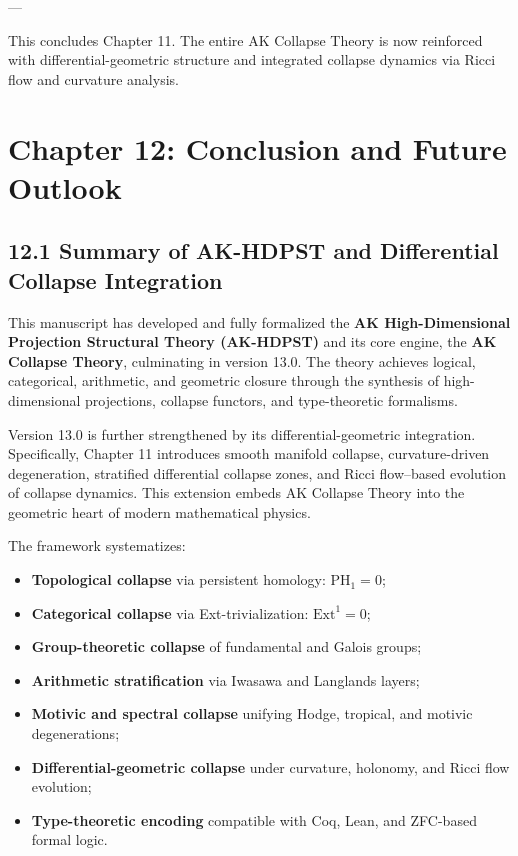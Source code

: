\documentclass[11pt]{article}
\begin{document}
---

\noindent This concludes Chapter 11. The entire AK Collapse Theory is now reinforced with differential-geometric structure and integrated collapse dynamics via Ricci flow and curvature analysis.



\section{Chapter 12: Conclusion and Future Outlook}

\subsection*{12.1 Summary of AK-HDPST and Differential Collapse Integration}

This manuscript has developed and fully formalized the \textbf{AK High-Dimensional Projection Structural Theory (AK-HDPST)} and its core engine, the \textbf{AK Collapse Theory}, culminating in version 13.0. The theory achieves logical, categorical, arithmetic, and geometric closure through the synthesis of high-dimensional projections, collapse functors, and type-theoretic formalisms.

Version 13.0 is further strengthened by its differential-geometric integration. Specifically, Chapter 11 introduces smooth manifold collapse, curvature-driven degeneration, stratified differential collapse zones, and Ricci flow–based evolution of collapse dynamics. This extension embeds AK Collapse Theory into the geometric heart of modern mathematical physics.

The framework systematizes:
\begin{itemize}
    \item \textbf{Topological collapse} via persistent homology: \( \mathrm{PH}_1 = 0 \);
    \item \textbf{Categorical collapse} via Ext-trivialization: \( \mathrm{Ext}^1 = 0 \);
    \item \textbf{Group-theoretic collapse} of fundamental and Galois groups;
    \item \textbf{Arithmetic stratification} via Iwasawa and Langlands layers;
    \item \textbf{Motivic and spectral collapse} unifying Hodge, tropical, and motivic degenerations;
    \item \textbf{Differential-geometric collapse} under curvature, holonomy, and Ricci flow evolution;
    \item \textbf{Type-theoretic encoding} compatible with Coq, Lean, and ZFC-based formal logic.
\end{itemize}
\end{document}
